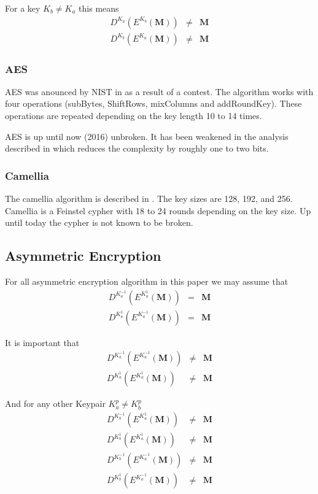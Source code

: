 For a key $K_b\neq K_a$ this means
\begin{eqnarray}
	D^{K_a}\left(E^{K_b}\left(\mathbf{M}\right)\right) & \neq & \mathbf{M}\\
	D^{K_b}\left(E^{K_a}\left(\mathbf{M}\right)\right) & \neq & \mathbf{M}
\end{eqnarray} 

\subsubsection{AES}
AES was anounced by NIST in \citeyear{standard2001announcing} as a result of a contest. The algorithm works with four operations (subBytes, ShiftRows, mixColumns and addRoundKey). These operations are repeated depending on the key length 10 to 14 times. 

AES is up until now (2016) unbroken. It has been weakened in the analysis described in \cite{tao2015improving} which reduces the complexity by roughly one to two bits. 

\subsubsection{Camellia}
The camellia algorithm is described in \cite{RFC3713}. The key sizes are 128, 192, and 256. Camellia is a Feinstel cypher with 18 to 24 rounds depending on the key size. Up until today the cypher is not known to be broken. 

\subsection{Asymmetric Encryption}
For all asymmetric encryption algorithm in this paper we may assume that 
\begin{eqnarray}
	D^{K^{-1}_a}\left(E^{K^{1}_a}\left(\mathbf{M}\right)\right) & = & \mathbf{M}\\
	D^{K^{1}_a}\left(E^{K^{-1}_a}\left(\mathbf{M}\right)\right) & = & \mathbf{M}
\end{eqnarray} 

It is important that 
\begin{eqnarray}
	D^{K^{-1}_a}\left(E^{K^{-1}_a}\left(\mathbf{M}\right)\right) & \neq & \mathbf{M}\\
	D^{K^{1}_a}\left(E^{K^{1}_a}\left(\mathbf{M}\right)\right)   & \neq & \mathbf{M}
\end{eqnarray} 

And for any other Keypair $K^{p}_a \neq K^{p}_b$
\begin{eqnarray}
	D^{K^{-1}_b}\left(E^{K^{1}_a}\left(\mathbf{M}\right)\right)  & \neq & \mathbf{M}\\
	D^{K^{1}_b}\left(E^{K^{1}_a}\left(\mathbf{M}\right)\right)   & \neq & \mathbf{M}\\
	D^{K^{-1}_b}\left(E^{K^{-1}_a}\left(\mathbf{M}\right)\right) & \neq & \mathbf{M}\\
	D^{K^{1}_b}\left(E^{K^{-1}_a}\left(\mathbf{M}\right)\right)  & \neq & \mathbf{M}
\end{eqnarray} 

